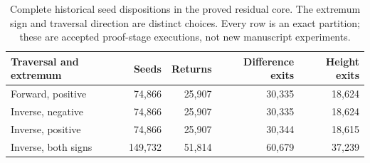 \begin{table}[htbp]
\centering\small
\caption{Complete historical seed dispositions in the proved
residual core. The extremum sign and traversal direction are
distinct choices. Every row is an exact partition; these are
accepted proof-stage executions, not new manuscript experiments.}
\label{tab:certificate}
\begin{tabular}{@{}lrrrr@{}}
\toprule
Traversal and extremum & Seeds & Returns & Difference exits & Height exits\\
\midrule
Forward, positive & 74,866 & 25,907 & 30,335 & 18,624\\
Inverse, negative & 74,866 & 25,907 & 30,335 & 18,624\\
Inverse, positive & 74,866 & 25,907 & 30,344 & 18,615\\
Inverse, both signs & 149,732 & 51,814 & 60,679 & 37,239\\
\bottomrule
\end{tabular}
\end{table}
